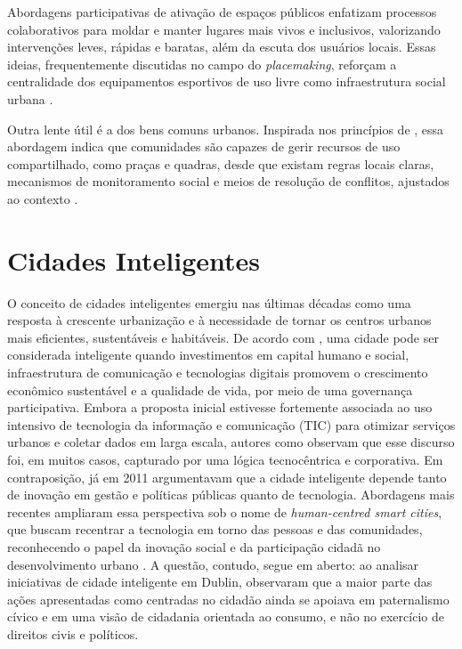         Abordagens participativas de ativação de espaços públicos enfatizam processos colaborativos para moldar e manter lugares mais vivos e inclusivos, valorizando intervenções leves, rápidas e baratas, além da escuta dos usuários locais. Essas ideias, frequentemente discutidas no campo do \textit{placemaking}, reforçam a centralidade dos equipamentos esportivos de uso livre como infraestrutura social urbana \cite{PPSWhatIs,PPSBooklet}.

        Outra lente útil é a dos bens comuns urbanos. Inspirada nos princípios de , essa abordagem indica que comunidades são capazes de gerir recursos de uso compartilhado, como praças e quadras, desde que existam regras locais claras, mecanismos de monitoramento social e meios de resolução de conflitos, ajustados ao contexto \cite{Ostrom1990,UrbanCommons2024}.

    \section{Cidades Inteligentes}

        O conceito de cidades inteligentes emergiu nas últimas décadas como uma resposta à crescente urbanização e à necessidade de tornar os centros urbanos mais eficientes, sustentáveis e habitáveis. De acordo com , uma cidade pode ser considerada inteligente quando investimentos em capital humano e social, infraestrutura de comunicação e tecnologias digitais promovem o crescimento econômico sustentável e a qualidade de vida, por meio de uma governança participativa. Embora a proposta inicial estivesse fortemente associada ao uso intensivo de tecnologia da informação e comunicação (TIC) para otimizar serviços urbanos e coletar dados em larga escala, autores como  observam que esse discurso foi, em muitos casos, capturado por uma lógica tecnocêntrica e corporativa. Em contraposição, já em 2011  argumentavam que a cidade inteligente depende tanto de inovação em gestão e políticas públicas quanto de tecnologia. Abordagens mais recentes ampliaram essa perspectiva sob o nome de \textit{human-centred smart cities}, que buscam recentrar a tecnologia em torno das pessoas e das comunidades, reconhecendo o papel da inovação social e da participação cidadã no desenvolvimento urbano \cite{Oliveira2020,UNHabitat2022}. A questão, contudo, segue em aberto: ao analisar iniciativas de cidade inteligente em Dublin,  observaram que a maior parte das ações apresentadas como centradas no cidadão ainda se apoiava em paternalismo cívico e em uma visão de cidadania orientada ao consumo, e não no exercício de direitos civis e políticos.

